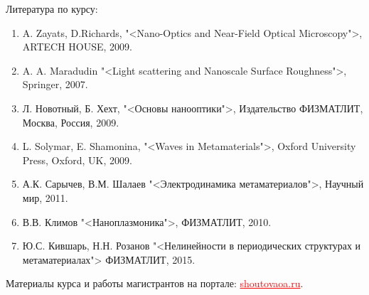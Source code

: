 \documentclass[9pt, compress, xcolor=table]{beamer}
\begin{document}

\begin{frame}{Литература по курсу:}

\begin{enumerate}
\item A. Zayats, D.Richards, "<Nano-Optics and Near-Field Optical Microscopy">, ARTECH HOUSE, 2009.
\item A. A. Maradudin "<Light scattering and Nanoscale Surface Roughness">, Springer, 2007.
\item Л. Новотный, Б. Хехт, "<Основы нанооптики">, Издательство ФИЗМАТЛИТ, Москва, Россия, 2009.
\item L. Solymar, E. Shamonina, "<Waves in Metamaterials">, Oxford University Press, Oxford, UK, 2009.
\item А.К. Сарычев, В.М. Шалаев "<Электродинамика метаматериалов">, Научный мир, 2011.
\item В.В. Климов "<Наноплазмоника">, ФИЗМАТЛИТ, 2010.
\item Ю.С. Кившарь, Н.Н. Розанов "<Нелинейности в периодических структурах и метаматериалах"> ФИЗМАТЛИТ, 2015.
\end{enumerate}

Материалы курса и работы магистрантов на портале:
\textcolor{red}{\underline{shoutovaoa.ru}}.


\end{frame}
\end{document}
